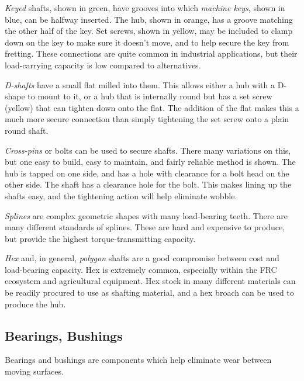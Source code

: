 \documentclass[10pt,letterpaper]{book}
\begin{document}
	\begin{asparaenum}[a)]
		\item \textit{Keyed} shafts, shown in green, have grooves into which \textit{machine keys}, shown in blue, can be halfway inserted. The hub, shown in orange, has a groove matching the other half of the key. Set screws, shown in yellow, may be included to clamp down on the key to make sure it doesn't move, and to help secure the key from fretting. These connections are quite common in industrial applications, but their load-carrying capacity is low compared to alternatives.
		\item \textit{D-shafts} have a small flat milled into them. This allows either a hub with a D-shape to mount to it, or a hub that is internally round but has a set screw (yellow) that can tighten down onto the flat. The addition of the flat makes this a much more secure connection than simply tightening the set screw onto a plain round shaft.
		\item \textit{Cross-pins} or bolts can be used to secure shafts. There many variations on this, but one easy to build, easy to maintain, and fairly reliable method is shown. The hub is tapped on one side, and has a hole with clearance for a bolt head on the other side. The shaft has a clearance hole for the bolt. This makes lining up the shafts easy, and the tightening action will help eliminate wobble.
		\item \textit{Splines} are complex geometric shapes with many load-bearing teeth. There are many different standards of splines. These are hard and expensive to produce, but provide the highest torque-transmitting capacity.
		\item \textit{Hex} and, in general, \textit{polygon} shafts are a good compromise between cost and load-bearing capacity. Hex is extremely common, especially within the FRC ecosystem and agricultural equipment. Hex stock in many different materials can be readily procured to use as shafting material, and a hex broach can be used to produce the hub.
	\end{asparaenum}
	
\subsection{Bearings, Bushings}

	Bearings and bushings are components which help eliminate wear between moving surfaces.
\end{document}
